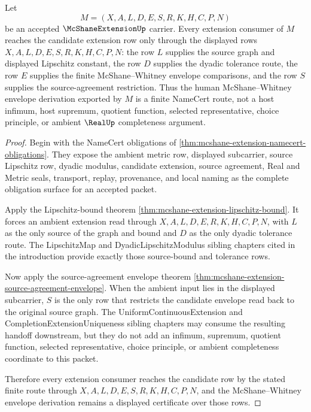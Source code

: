 \begin{theorem}
\label{thm:mcshane-extension-finite-envelope-route}
Let
$$
M=(X,A,L,D,E,S,R,K,H,C,P,N)
$$
be an accepted $\McShaneExtensionUp$ carrier. Every extension consumer of $M$ reaches the candidate extension row only through the displayed rows $X,A,L,D,E,S,R,K,H,C,P,N$: the row $L$ supplies the source graph and displayed Lipschitz constant, the row $D$ supplies the dyadic tolerance route, the row $E$ supplies the finite McShane--Whitney envelope comparisons, and the row $S$ supplies the source-agreement restriction. Thus the human McShane--Whitney envelope derivation exported by $M$ is a finite NameCert route, not a host infimum, host supremum, quotient function, selected representative, choice principle, or ambient $\RealUp$ completeness argument.
\end{theorem}
\begin{proof}
Begin with the NameCert obligations of \autoref{thm:mcshane-extension-namecert-obligations}. They expose the ambient metric row, displayed subcarrier, source Lipschitz row, dyadic modulus, candidate extension, source agreement, Real and Metric seals, transport, replay, provenance, and local naming as the complete obligation surface for an accepted packet.

Apply the Lipschitz-bound theorem \autoref{thm:mcshane-extension-lipschitz-bound}. It forces an ambient extension read through $X,A,L,D,E,R,K,H,C,P,N$, with $L$ as the only source of the graph and bound and $D$ as the only dyadic tolerance route. The LipschitzMap and DyadicLipschitzModulus sibling chapters cited in the introduction provide exactly those source-bound and tolerance rows.

Now apply the source-agreement envelope theorem \autoref{thm:mcshane-extension-source-agreement-envelope}. When the ambient input lies in the displayed subcarrier, $S$ is the only row that restricts the candidate envelope read back to the original source graph. The UniformContinuousExtension and CompletionExtensionUniqueness sibling chapters may consume the resulting handoff downstream, but they do not add an infimum, supremum, quotient function, selected representative, choice principle, or ambient completeness coordinate to this packet.

Therefore every extension consumer reaches the candidate row by the stated finite route through $X,A,L,D,E,S,R,K,H,C,P,N$, and the McShane--Whitney envelope derivation remains a displayed certificate over those rows.
\end{proof}

